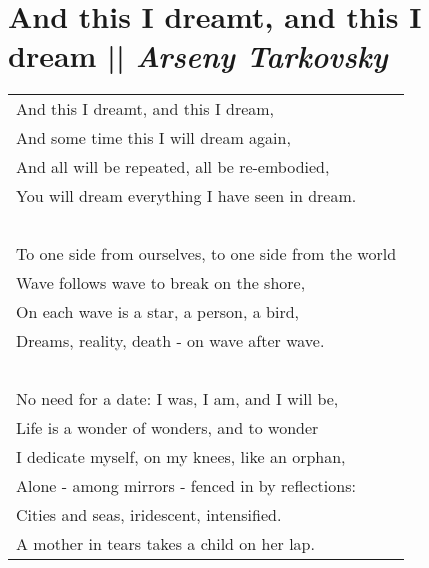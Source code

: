 \section[And this I dreamt, and this I dream]{And this I dreamt, and this I dream || \emph{Arseny Tarkovsky} \hspace*{\fill}  \thepage}
\label{sec:And_this_I_dreamt,_and_this_I_dream.tex}
\hspace{0pt}
\vfill
\begin{center}
\begin{tabular}{l}
And this I dreamt, and this I dream,\\
And some time this I will dream again,\\
And all will be repeated, all be re-embodied,\\
You will dream everything I have seen in dream.\\
\-\ \\
To one side from ourselves, to one side from the world\\
Wave follows wave to break on the shore,\\
On each wave is a star, a person, a bird,\\
Dreams, reality, death - on wave after wave.\\
\-\ \\
No need for a date: I was, I am, and I will be,\\
Life is a wonder of wonders, and to wonder\\
I dedicate myself, on my knees, like an orphan,\\
Alone - among mirrors - fenced in by reflections:\\
Cities and seas, iridescent, intensified.\\
A mother in tears takes a child on her lap.\\
\end{tabular}
\end{center}
\vfill
\hspace{0pt}